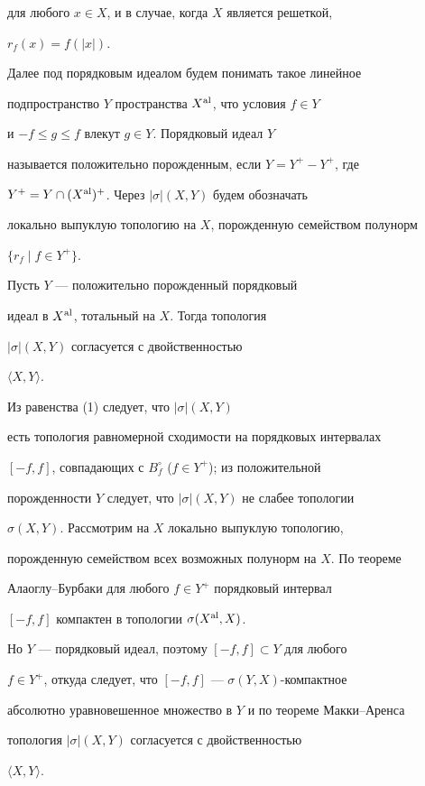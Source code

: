 для любого $x \in X$, и в случае, когда $X$ является решеткой, 


$r_f (x)=f(|x|)$.





Далее под порядковым идеалом будем понимать такое линейное 


подпространство $Y$ пространства $X^{\operatorname{al}}$, что условия $f \in Y$ 


и $- f \le g \le f$ влекут $g \in Y$. Порядковый идеал $Y$ 


называется положительно порожденным, если $Y=Y^+ - Y^+$, где 


$Y^+=Y \cap (X^{\operatorname{al}})^+$. Через $| \sigma | (X,Y)$ будем обозначать 


локально выпуклую топологию на $X$, порожденную семейством полунорм 


$\{r_f \mid f \in Y^+\}$.





\begin{prop}


Пусть $Y$ --- положительно порожденный порядковый 


идеал в $X^{\operatorname{al}}$, тотальный на $X$. Тогда топология 


$| \sigma | (X,Y)$ согласуется с двойственностью 


$ \langle X,Y \rangle $.


\end{prop}





\begin{pf}


Из равенства (1) следует, что $| \sigma | (X,Y)$


есть топология равномерной сходимости на порядковых интервалах 


$[- f,f]$, совпадающих с $B_f^{\circ}$ ($f \in Y^+$); из положительной 


порожденности $Y$ следует, что $| \sigma | (X,Y)$ не слабее топологии 


$\sigma (X,Y)$. Рассмотрим на $X$ локально выпуклую топологию, 


порожденную семейством всех возможных полунорм на $X$. По теореме 


Алаоглу--Бурбаки для любого $f \in Y^+$ порядковый интервал 


$[-f,f]$ компактен в топологии $ \sigma (X^{\operatorname{al}},X)$. 


Но $Y$ --- порядковый идеал, поэтому $[-f,f] \subset Y$ для любого 


$f \in Y^+$, откуда следует, что $[-f,f]$ --- $\sigma (Y,X)$-компактное 


абсолютно уравновешенное множество в $Y$ и по теореме Макки--Аренса 


топология $| \sigma | (X,Y)$ согласуется с двойственностью 


$ \langle X,Y \rangle $.


\end{pf}





